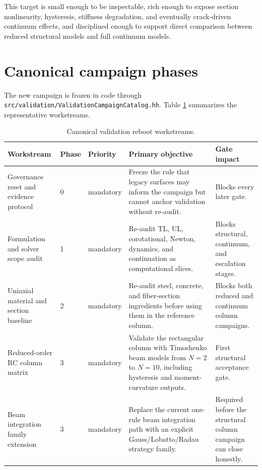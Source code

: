 This target is small enough to be inspectable, rich enough to expose section
nonlinearity, hysteresis, stiffness degradation, and eventually crack-driven
continuum effects, and disciplined enough to support direct comparison between
reduced structural models and full continuum models.

\section{Canonical campaign phases}

The new campaign is frozen in code through
\texttt{src/validation/ValidationCampaignCatalog.hh}.  Table
\ref{tab:validation-reboot-phases} summarizes the representative workstreams.

\begin{table}[htbp]
  \centering
  \caption{Canonical validation reboot workstreams.}
  \label{tab:validation-reboot-phases}
  \scriptsize
  \setlength{\tabcolsep}{3pt}
  \begin{tabularx}{\textwidth}{@{}p{}p{}p{}p{}X@{}}
    \toprule
    \textbf{Workstream} & \textbf{Phase} & \textbf{Priority} &
    \textbf{Primary objective} & \textbf{Gate impact} \\
    \midrule
    Governance reset and evidence protocol
    & 0 & mandatory
    & Freeze the rule that legacy surfaces may inform the campaign but cannot
      anchor validation without re-audit.
    & Blocks every later gate. \\

    Formulation and solver scope audit
    & 1 & mandatory
    & Re-audit TL, UL, corotational, Newton, dynamics, and continuation as
      computational slices.
    & Blocks structural, continuum, and escalation stages. \\

    Uniaxial material and section baseline
    & 2 & mandatory
    & Re-audit steel, concrete, and fiber-section ingredients before using them
      in the reference column.
    & Blocks both reduced and continuum column campaigns. \\

    Reduced-order RC column matrix
    & 3 & mandatory
    & Validate the rectangular column with Timoshenko beam models from
      \(N=2\) to \(N=10\), including hysteresis and moment-curvature outputs.
    & First structural acceptance gate. \\

    Beam integration family extension
    & 3 & mandatory
    & Replace the current one-rule beam integration path with an explicit
      Gauss/Lobatto/Radau strategy family.
    & Required before the structural column campaign can close honestly. \\


\end{tabularx}
\end{table}
